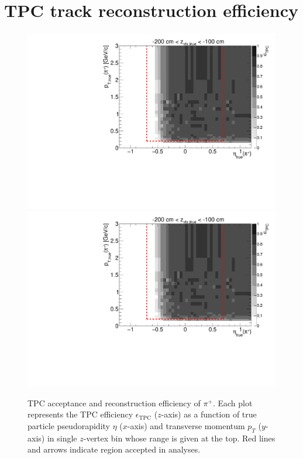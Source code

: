 
\chapter{TPC track reconstruction efficiency}\label{appendix:tpcEff}


\begin{figure}[hb]
\caption[TPC acceptance and reconstruction efficiency of $\pi^{+}$.]{TPC acceptance and reconstruction efficiency of $\pi^{+}$. Each plot represents the TPC efficiency $\epsilon_{\text{TPC}}$ ($z$-axis) as a function of true particle pseudorapidity $\eta$ ($x$-axis) and transverse momentum $p_{T}$ ($y$-axis) in single $z$-vertex bin whose range is given at the top. Red lines and arrows indicate region accepted in analyses.}\label{fig:eff_pion_plus}
\centering
\parbox{0.495\textwidth}{
  \centering
  \includegraphics[width=\linewidth,page=3]{graphics/eff/Eff2D_TPC_pion_Plus.pdf}\\
  \includegraphics[width=\linewidth,page=5]{graphics/eff/Eff2D_TPC_pion_Plus.pdf}\\
}
\end{figure}
